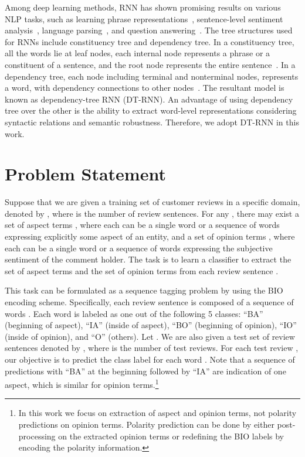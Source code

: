 \documentclass[11pt,letterpaper]{article}
\begin{document}
Among deep learning methods, RNN has shown promising results on various NLP tasks, such as learning phrase representations~\cite{socher10}, sentence-level sentiment analysis~\cite{Socher13}, language parsing~\cite{Socher11a}, and question answering~\cite{DBLP:conf/emnlp/IyyerBCSD14}. The tree structures used for RNNs include constituency tree and dependency tree. In a constituency tree, all the words lie at leaf nodes, each internal node represents a phrase or a constituent of a sentence, and the root node represents the entire sentence~\cite{socher10,Socher12,Socher13}. In a dependency tree, each node including terminal and nonterminal nodes, represents a word, with dependency connections to other nodes~\cite{Socher14,DBLP:conf/emnlp/IyyerBCSD14}. The resultant model is known as dependency-tree RNN (DT-RNN). An advantage of using dependency tree over the other is the ability to extract word-level representations considering syntactic relations and semantic robustness. Therefore, we adopt DT-RNN in this work.


\section{Problem Statement}\label{sec:definition}
Suppose that we are given a training set of customer reviews in a specific domain, denoted by , where  is the number of review sentences. For any , there may exist a set of aspect terms , where each  can be a single word or a sequence of words expressing explicitly some aspect of an entity, and a set of opinion terms , where each  can be a single word or a sequence of words expressing the subjective sentiment of the comment holder. The task is to learn a classifier to extract the set of aspect terms  and the set of opinion terms  from each review sentence .

This task can be formulated as a sequence tagging problem by using the BIO encoding scheme. Specifically, each review sentence  is composed of a sequence of words . Each word  is labeled as one out of the following 5 classes: ``BA'' (beginning of aspect), ``IA'' (inside of aspect), ``BO'' (beginning of opinion), ``IO'' (inside of opinion), and ``O'' (others). Let . We are also given a test set of review sentences denoted by , where  is the number of test reviews. For each test review , our objective is to predict the class label  for each word . Note that a sequence of predictions with ``BA'' at the beginning followed by ``IA'' are indication of one aspect, which is similar for opinion terms.\footnote{In this work we focus on extraction of aspect and opinion terms, not polarity predictions on opinion terms. Polarity prediction can be done by either post-processing on the extracted opinion terms or redefining the BIO labels by encoding the polarity information.}
\end{document}
